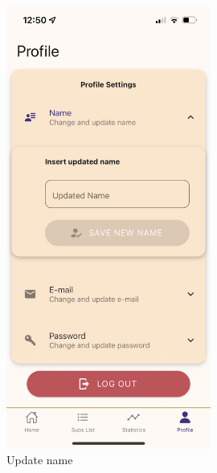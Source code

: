 \documentclass[11pt]{article}
\begin{document}
\begin{figure}[h!]
    \centering
    \begin{minipage}[c]{0.45\textwidth}
        \centering
        \includegraphics[width=0.6\textwidth, clip]{../../assets/smartphone/profileNewName.PNG}
        \caption{Update name}
        \label{fig:profileNewName}
    \end{minipage}\hspace{1cm}%
    \begin{minipage}[c]{0.45\textwidth}
        \centering

\end{minipage}
\end{figure}
\end{document}
